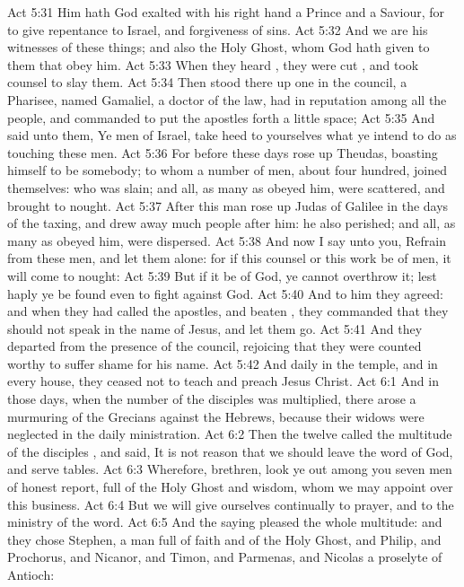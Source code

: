 \vs Act 5:31 Him hath God exalted with his right hand  a Prince and a Saviour, for to give repentance to Israel, and forgiveness of sins.
\vs Act 5:32 And we are his witnesses of these things; and  also the Holy Ghost, whom God hath given to them that obey him.
\vs Act 5:33 When they heard , they were cut , and took counsel to slay them.
\vs Act 5:34 Then stood there up one in the council, a Pharisee, named Gamaliel, a doctor of the law, had in reputation among all the people, and commanded to put the apostles forth a little space;
\vs Act 5:35 And said unto them, Ye men of Israel, take heed to yourselves what ye intend to do as touching these men.
\vs Act 5:36 For before these days rose up Theudas, boasting himself to be somebody; to whom a number of men, about four hundred, joined themselves: who was slain; and all, as many as obeyed him, were scattered, and brought to nought.
\vs Act 5:37 After this man rose up Judas of Galilee in the days of the taxing, and drew away much people after him: he also perished; and all,  as many as obeyed him, were dispersed.
\vs Act 5:38 And now I say unto you, Refrain from these men, and let them alone: for if this counsel or this work be of men, it will come to nought:
\vs Act 5:39 But if it be of God, ye cannot overthrow it; lest haply ye be found even to fight against God.
\vs Act 5:40 And to him they agreed: and when they had called the apostles, and beaten , they commanded that they should not speak in the name of Jesus, and let them go.
\vs Act 5:41 And they departed from the presence of the council, rejoicing that they were counted worthy to suffer shame for his name.
\vs Act 5:42 And daily in the temple, and in every house, they ceased not to teach and preach Jesus Christ.
\vs Act 6:1 And in those days, when the number of the disciples was multiplied, there arose a murmuring of the Grecians against the Hebrews, because their widows were neglected in the daily ministration.
\vs Act 6:2 Then the twelve called the multitude of the disciples , and said, It is not reason that we should leave the word of God, and serve tables.
\vs Act 6:3 Wherefore, brethren, look ye out among you seven men of honest report, full of the Holy Ghost and wisdom, whom we may appoint over this business.
\vs Act 6:4 But we will give ourselves continually to prayer, and to the ministry of the word.
\vs Act 6:5 And the saying pleased the whole multitude: and they chose Stephen, a man full of faith and of the Holy Ghost, and Philip, and Prochorus, and Nicanor, and Timon, and Parmenas, and Nicolas a proselyte of Antioch:
